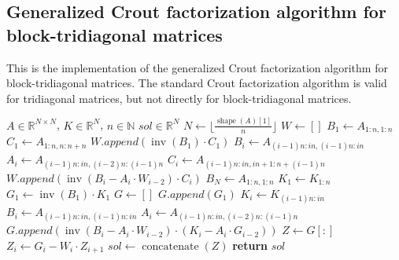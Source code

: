 \documentclass[a4paper]{article}
\begin{document}
\subsection{Generalized Crout factorization algorithm for block-tridiagonal matrices}
This is the implementation of the generalized Crout factorization algorithm for block-tridiagonal matrices. The standard Crout factorization algorithm is valid for tridiagonal matrices, but not directly for block-tridiagonal matrices.
\begin{algorithm}[H]
\caption{Crout Generalization Algorithm for Tridiagonal Block Matrices}\label{alg::Crout}
\begin{algorithmic}[H]
\Require $A \in \mathbb{R}^{N \times N}$, $K \in \mathbb{R}^{N}$, $n \in \mathbb{N}$
\Ensure $sol \in \mathbb{R}^{N}$
\State $N \gets \lfloor \frac{\operatorname{shape}(A)[1]}{n} \rfloor$
\State $W \gets []$
\State $B_1 \gets A_{1:n,1:n}$
\State $C_1 \gets A_{1:n,n:n+n}$
\State $W.append(\operatorname{inv}(B_1) \cdot C_1)$
\State $B_i \gets A_{(i-1)n:in,(i-1)n:in}$
\State $A_i \gets A_{(i-1)n:in,(i-2)n:(i-1)n}$
\State $C_i \gets A_{(i-1)n:in,in+1:n+(i-1)n}$
\State $W.append(\operatorname{inv}(B_i - A_i \cdot W_{i-2}) \cdot C_i)$
\EndFor
\State $B_N \gets A_{1:n,1:n}$
\State $K_1 \gets K_{1:n}$
\State $G_1 \gets \operatorname{inv}(B_1) \cdot K_1$
\State $G \gets []$
\State $G.append(G_1)$
\State $K_i \gets K_{(i-1)n:in}$
\State $B_i \gets A_{(i-1)n:in,(i-1)n:in}$
\State $A_i \gets A_{(i-1)n:in,(i-2)n:(i-1)n}$
\State $G.append(\operatorname{inv}(B_i - A_i \cdot W_{i-2}) \cdot (K_i - A_i \cdot G_{i-2}))$
\EndFor
\State $Z \gets G[:]$
\State $Z_i \gets G_i - W_i \cdot Z_{i+1}$
\EndFor
\State $sol \gets \operatorname{concatenate}(Z)$
\State \textbf{return} $sol$
\EndFunction
\end{algorithmic}
\end{algorithm}
\end{document}
